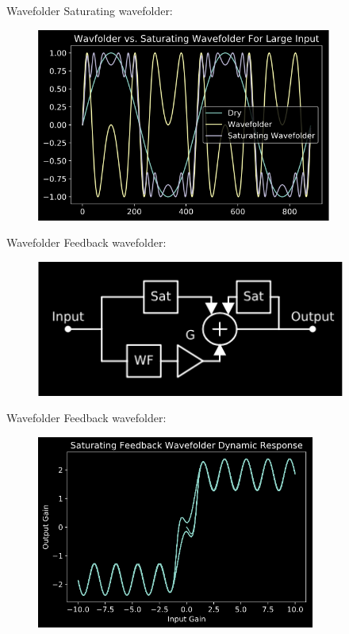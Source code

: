 \begin{frame}{Wavefolder}
    Saturating wavefolder:
    \begin{figure}
        \centering
        \includegraphics[height=2.5in]{../Wavefolder/Pics/sat_wave_large}
    \end{figure}
\end{frame}

\begin{frame}{Wavefolder}
    Feedback wavefolder:
    \begin{figure}
        \centering
        \includegraphics[width=4in]{../Wavefolder/Pics/fb_arch}
    \end{figure}
\end{frame}

\begin{frame}{Wavefolder}
    Feedback wavefolder:
    \begin{figure}
        \centering
        \includegraphics[height=2.5in]{../Wavefolder/Pics/fb_dyn}
    \end{figure}
\end{frame}
